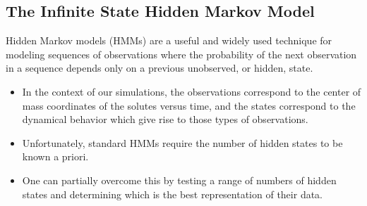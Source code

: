 \documentclass{article}
\begin{document}

  \subsection{The Infinite State Hidden Markov Model}\label{method:iHMM}  %
  
  Hidden Markov models (HMMs) are a useful and widely used technique
  for modeling sequences of observations where the probability of the next observation
  in a sequence depends only on a previous unobserved, or hidden, state.~\cite{beal_infinite_2002}
  \begin{itemize}
    \item In the context of our simulations, the observations correspond to 
    the center of mass coordinates of the solutes versus time, and the states
    correspond to the dynamical behavior which give rise to those types
    of observations.
    \item Unfortunately, standard HMMs require the number of hidden states to be known
    a priori.
    \item One can partially overcome this by testing a range of numbers of 
    hidden states and determining which is the best representation of their
    data.
  \end{itemize}
  
\end{document}
